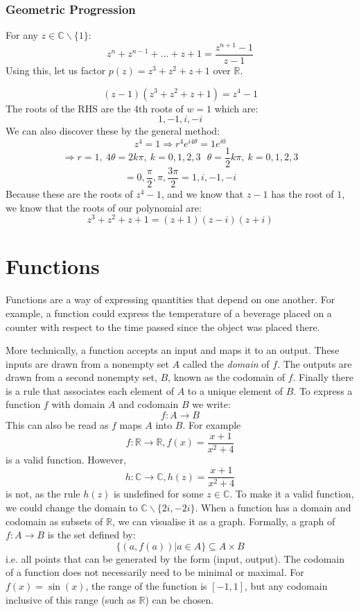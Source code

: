 \documentclass[12pt]{report}
\newcommand{\R}{\mathbb{R}}
\newcommand{\C}{\mathbb{C}}
\begin{document}
\begin{flushleft}
\subsubsection*{Geometric Progression}
For any \(z \in \C \backslash \{1\}\):
\[z^n + z^{n - 1} + ... + z + 1 = \frac{z^{n + 1} - 1}{z - 1}\]
Using this, let us factor \(p(z) = z^3 + z^2 + z + 1\) over \(\R\).
\begin{center}
    \[(z - 1)(z^3 + z^2 + z + 1) = z^4 - 1\]
    The roots of the RHS are the 4th roots of \(w = 1\) which are:
    \[1, -1, i, -i\]
    We can also discover these by the general method:
    \[z^4 = 1 \Rightarrow r^4e^{i4\theta} = 1e^{i0}\]
    \[\Rightarrow r = 1,\: 4\theta = 2k\pi,\: k = 0, 1, 2, 3 \:\:\: 
    \theta = \frac{1}{2}k\pi,\: k = 0, 1, 2, 3\]
    \[= 0, \frac{\pi}{2}, \pi, \frac{3\pi}{2} = 1, i, -1, -i\]
    Because these are the roots of \(z^4 - 1\), and we know that \(z - 1\) has
    the root of \(1\), we know that the roots of our polynomial are:
    \[z^3 + z^2 + z + 1 = (z + 1)(z - i)(z + i)\]
\end{center}

\section*{Functions}
Functions are a way of expressing quantities that depend on one another.
For example, a function could express the temperature of a beverage placed on a
counter with respect to the time passed since the object was placed there.

\bigskip
More technically, a function accepts an input and maps it to an output. These
inputs are drawn from a nonempty set \(A\) called the \textit{domain} of \(f\).
The outputs are drawn from a second nonempty set, \(B\), known as the codomain
of \(f\). Finally there is a rule that associates each element of \(A\) to a 
unique element of \(B\). To express a function \(f\) with domain \(A\) and 
codomain \(B\) we write:
\[f: A \rightarrow B\]
This can also be read as \(f\) maps \(A\) into \(B\). For example
\[f: \R \rightarrow \R, f(x) = \frac{x + 1}{x^2 + 4}\]
is a valid function. However,
\[h: \C \rightarrow \C, h(z) = \frac{x + 1}{x^2 + 4}\]
is not, as the rule \(h(z)\) is undefined for some \(z \in \C\).
To make it a valid function, we could change the domain to
\(\C \backslash \{2i, -2i\}\).
When a function has a domain and codomain as subsets of \(\R\), we can
visualise it as a graph. Formally, a graph of \(f: A \rightarrow B\) is the set
defined by:
\[\{(a, f(a)) | a \in A\} \subseteq A \times B\]
i.e. all points that can be generated by the form (input, output). The codomain
of a function does not necessarily need to be minimal or maximal. For 
\(f(x) = \sin(x)\), the range of the function is \([-1, 1]\), but any codomain
inclusive of this range (such as \(\R\)) can be chosen.


\end{flushleft}
\end{document}
